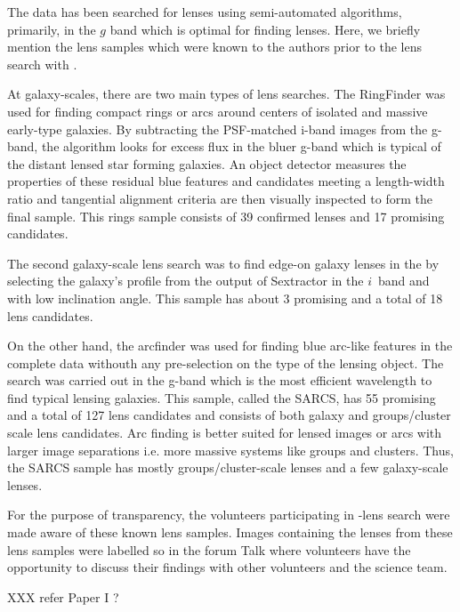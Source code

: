 \documentclass[useAMS,usenatbib,a4paper]{mn2e}
\begin{document}
The \cfhtls data has been searched for lenses using semi-automated
algorithms, primarily, in the $g$ band which is optimal for finding
lenses. Here, we briefly mention the lens samples which were known to
the authors prior to the lens search with \sw.

At galaxy-scales, there are two main types of lens searches. The
RingFinder \citet{Gavazzi2014} was used for finding compact rings or arcs
around centers of isolated and massive early-type galaxies. By
subtracting the PSF-matched i-band images from the g-band, the
algorithm looks for excess flux in the bluer g-band which is typical of
the distant lensed star forming galaxies. An object detector measures
the properties of these residual blue features and candidates meeting a
length-width ratio and tangential alignment criteria are then visually
inspected to form the final sample. This rings sample consists of 39
confirmed lenses and 17 promising candidates. 

The second galaxy-scale lens search was to find edge-on galaxy lenses in
the \cfhtls \citep{Sygnet2010} by selecting the galaxy's profile from the
output of {\sc Sextractor} in the $i$~band and with low inclination
angle. This sample has about 3 promising and a total of 18 lens
candidates.
 
On the other hand, the {\sc arcfinder} \citet{More2012} was used for
finding blue arc-like features in the complete \cfhtls data withouth any
pre-selection on the type of the lensing object. The search was carried
out in the g-band which is the most efficient wavelength to find typical
lensing galaxies. This sample, called the SARCS, has 55 promising and a
total of 127 lens candidates and consists of both galaxy and
groups/cluster scale lens candidates. Arc finding is better suited for
lensed images or arcs with larger image separations i.e. more massive
systems like groups and clusters. Thus, the SARCS sample has mostly
groups/cluster-scale lenses and a few galaxy-scale lenses.

For the purpose of transparency, the volunteers participating in
\sw-\cfhtls lens search were made aware of these known lens samples. Images
containing the lenses from these lens samples were labelled so in the
forum Talk where volunteers have the opportunity to discuss their
findings with other volunteers and the science team. 

XXX refer Paper I ?


\end{document}

